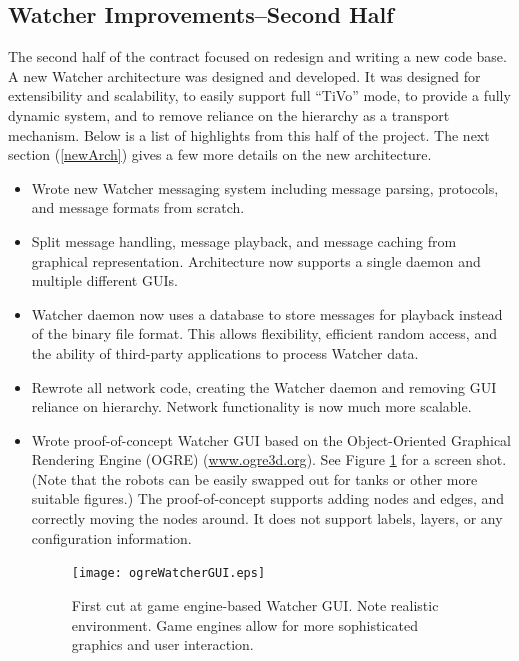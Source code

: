 \documentclass{report}
\begin{document}
\subsection{Watcher Improvements--Second Half}
The second half of the contract focused on redesign and writing a new code base. A new Watcher architecture was designed and developed. It was 
designed for extensibility and scalability, to easily support full ``TiVo'' mode, to provide a fully dynamic system, and to remove reliance
on the hierarchy as a transport mechanism. Below is a list of highlights from this half of the project. The next section (\ref{newArch}) gives a few more details
on the new architecture.

\begin{itemize}
\item Wrote new Watcher messaging system including message parsing, protocols, and message formats from scratch. 
\item Split message handling, message playback, and message caching from graphical representation. Architecture now
supports a single daemon and multiple different GUIs. 
\item Watcher daemon now uses a database to store messages for playback instead of the binary file format. This allows
flexibility, efficient random access, and the ability of third-party applications to process Watcher data. 
\item Rewrote all network code, creating the Watcher daemon and removing GUI reliance on hierarchy. Network functionality is now
much more scalable. 
\item Wrote proof-of-concept Watcher GUI based on the Object-Oriented Graphical Rendering Engine (OGRE) (\url{www.ogre3d.org}). See Figure \ref{fig:ogreWatcherGUI} for a
screen shot. (Note that the robots can be easily swapped out for tanks or other more suitable figures.) The proof-of-concept supports adding nodes and edges, and 
correctly moving the nodes around. It does not support labels, layers, or any configuration information. 

\begin{figure}[htb]
\centering
\texttt{[image: ogreWatcherGUI.eps]}
\caption{First cut at game engine-based Watcher GUI. Note realistic environment. Game engines allow for more sophisticated graphics and user interaction.}
\label{fig:ogreWatcherGUI}
\end{figure}


\end{itemize}
\end{document}
